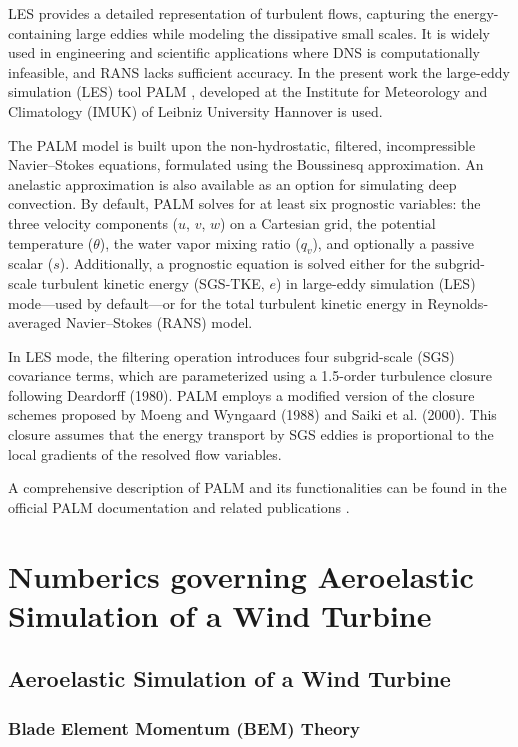 LES provides a detailed representation of turbulent flows, capturing the energy-containing large eddies while modeling the dissipative small scales. It is widely used in engineering and scientific applications where DNS is computationally infeasible, and RANS lacks sufficient accuracy. In the present work the
large-eddy simulation (LES) tool PALM \cite{maronga2015}, developed at the Institute for Meteorology and
Climatology (IMUK) of Leibniz University Hannover is used. 

The PALM model is built upon the non-hydrostatic, filtered, incompressible Navier–Stokes equations, formulated using the Boussinesq approximation. An anelastic approximation is also available as an option for simulating deep convection. By default, PALM solves for at least six prognostic variables: the three velocity components ($u$, $v$, $w$) on a Cartesian grid, the potential temperature ($\theta$), the water vapor mixing ratio ($q_v$), and optionally a passive scalar ($s$). Additionally, a prognostic equation is solved either for the subgrid-scale turbulent kinetic energy (SGS-TKE, $e$) in large-eddy simulation (LES) mode—used by default—or for the total turbulent kinetic energy in Reynolds-averaged Navier–Stokes (RANS) model.

In LES mode, the filtering operation introduces four subgrid-scale (SGS) covariance terms, which are parameterized using a 1.5-order turbulence closure following Deardorff (1980). PALM employs a modified version of the closure schemes proposed by Moeng and Wyngaard (1988) and Saiki et al. (2000). This closure assumes that the energy transport by SGS eddies is proportional to the local gradients of the resolved flow variables.

A comprehensive description of PALM and its functionalities can be found in the official PALM documentation and related publications\cite{maronga2015} \cite{raasch2001}.

\chapter{Numberics governing Aeroelastic Simulation of a Wind Turbine}
\section{Aeroelastic Simulation of a Wind Turbine}

\subsection{Blade Element Momentum (BEM) Theory} 
\label{sec:bem_theory}

